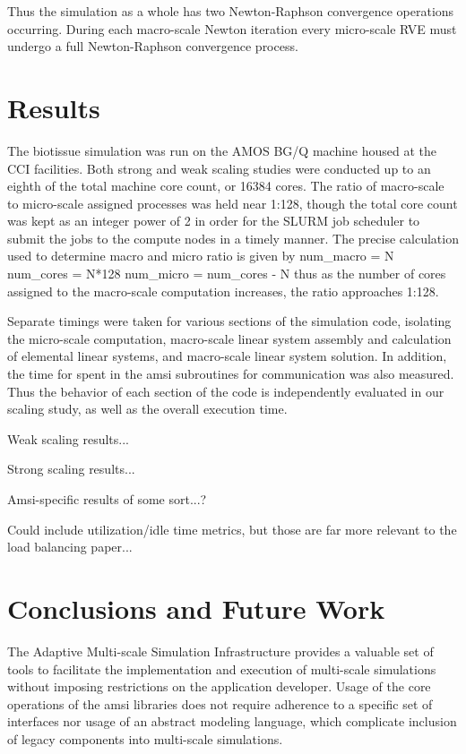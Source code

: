 \documentclass[11pt]{siamltex1213}
\begin{document}
Thus the simulation as a whole has two Newton-Raphson convergence operations occurring. During each macro-scale Newton iteration every micro-scale RVE must undergo a full Newton-Raphson convergence process. 

\section{Results}\label{results}
The biotissue simulation was run on the AMOS BG/Q machine housed at the CCI facilities. Both strong and weak scaling studies were conducted up to an eighth of the total machine core count, or 16384 cores. The ratio of macro-scale to micro-scale assigned processes was held near 1:128, though the total core count was kept as an integer power of 2 in order for the SLURM job scheduler to submit the jobs to the compute nodes in a timely manner. The precise calculation used to determine macro and micro ratio is given by 
%
num_macro = N 
num_cores = N*128
num_micro = num_cores - N
%
thus as the number of cores assigned to the macro-scale computation increases, the ratio approaches 1:128. 

Separate timings were taken for various sections of the simulation code, isolating the micro-scale computation, macro-scale linear system assembly and calculation of elemental linear systems, and macro-scale linear system solution. In addition, the time for spent in the amsi subroutines for communication was also measured. Thus the behavior of each section of the code is independently evaluated in our scaling study, as well as the overall execution time.

Weak scaling results...

Strong scaling results...

Amsi-specific results of some sort...?

Could include utilization/idle time metrics, but those are far more relevant to the load balancing paper...

\section{Conclusions and Future Work}\label{future_work}

The Adaptive Multi-scale Simulation Infrastructure provides a valuable set of tools to facilitate the implementation and execution of multi-scale simulations without imposing restrictions on the application developer. Usage of the core operations of the amsi libraries does not require adherence to a specific set of interfaces nor usage of an abstract modeling language, which complicate inclusion of legacy components into multi-scale simulations.
\end{document}
